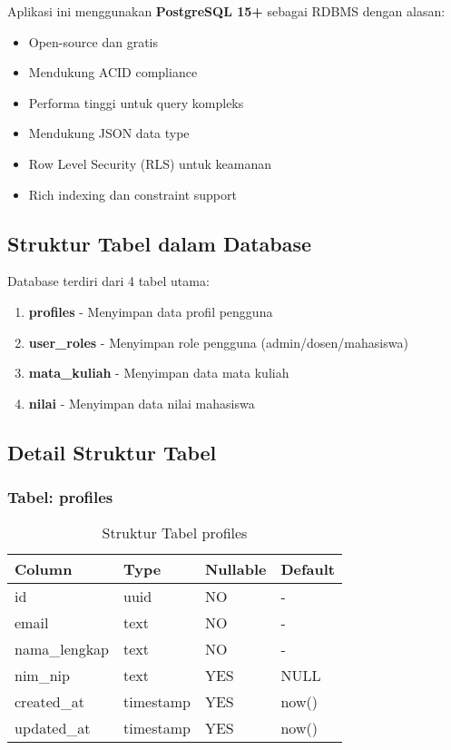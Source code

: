 \documentclass[12pt,a4paper]{article}
\begin{document}
Aplikasi ini menggunakan \textbf{PostgreSQL 15+} sebagai RDBMS dengan alasan:

\begin{itemize}
    \item Open-source dan gratis
    \item Mendukung ACID compliance
    \item Performa tinggi untuk query kompleks
    \item Mendukung JSON data type
    \item Row Level Security (RLS) untuk keamanan
    \item Rich indexing dan constraint support
\end{itemize}

\subsection{Struktur Tabel dalam Database}

Database terdiri dari 4 tabel utama:

\begin{enumerate}
    \item \textbf{profiles} - Menyimpan data profil pengguna
    \item \textbf{user\_roles} - Menyimpan role pengguna (admin/dosen/mahasiswa)
    \item \textbf{mata\_kuliah} - Menyimpan data mata kuliah
    \item \textbf{nilai} - Menyimpan data nilai mahasiswa
\end{enumerate}

\subsection{Detail Struktur Tabel}

\subsubsection{Tabel: profiles}

\begin{table}[H]
\centering
\begin{tabular}{|l|l|l|l|}
\hline
\textbf{Column} & \textbf{Type} & \textbf{Nullable} & \textbf{Default} \\
\hline
id & uuid & NO & - \\
email & text & NO & - \\
nama\_lengkap & text & NO & - \\
nim\_nip & text & YES & NULL \\
created\_at & timestamp & YES & now() \\
updated\_at & timestamp & YES & now() \\
\hline
\end{tabular}
\caption{Struktur Tabel profiles}
\end{table}
\end{document}

